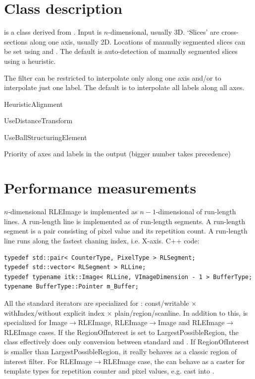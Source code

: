 \documentclass{InsightArticle}
\begin{document}
\section{Class description}

 is a class derived from
.
Input is $n$-dimensional, usually 3D.
`Slices' are cross-sections along one axis, usually 2D.
Locations of manually segmented slices can be set using
 and .
The default is auto-detection of manually segmented slices using a heuristic.

The filter can be restricted to interpolate only along one axis
and/or to interpolate just one label.
The default is to interpolate all labels along all axes.

HeuristicAlignment

UseDistanceTransform

UseBallStructuringElement

Priority of axes and labels in the output (bigger number takes precedence)


\section{Performance measurements}

$n$-dimensional RLEImage is implemented as $n-1$-dimensional  of run-length lines.
A run-length line is implemented as  of run-length segments.
A run-length segment is a pair consisting of pixel value and its repetition count.
A run-length line runs along the fastest chaning index, i.e. X-axis. C++ code:

\begin{verbatim}
typedef std::pair< CounterType, PixelType > RLSegment;
typedef std::vector< RLSegment > RLLine;
typedef typename itk::Image< RLLine, VImageDimension - 1 > BufferType;
typename BufferType::Pointer m_Buffer;
\end{verbatim}

All the standard iterators are specialized for :
const/writable $\times$ withIndex/without explicit index $\times$ plain/region/scanline.
In addition to this,  is specialized for
Image$\rightarrow$RLEImage, RLEImage$\rightarrow$Image and RLEImage$\rightarrow$RLEImage cases.
If the RegionOfInterest is set to LargestPossibleRegion, the class effectively
does only conversion between standard  and .
If RegionOfInterest is smaller than LargestPossibleRegion,
it really behaves as a classic region of interest filter.
For RLEImage$\rightarrow$RLEImage case, the 
can behave as a caster for template types for repetition counter and pixel values,
e.g. cast  into .
\end{document}
